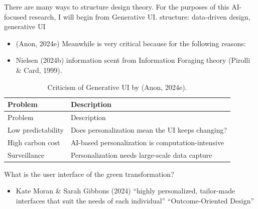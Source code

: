 \documentclass[
  letterpaper,
  DIV=11,
  numbers=noendperiod]{scrartcl}
\providecommand{\tightlist}{%
  \setlength{\itemsep}{0pt}\setlength{\parskip}{0pt}}\usepackage{longtable,booktabs,array}
\begin{document}
There are many ways to structure design theory. For the purposes of this
AI-focused research, I will begin from Generative UI. structure:
data-driven design, generative UI

\begin{itemize}
\item
  (Anon, 2024e) Meanwhile is very critical because for the following
  reasons:
\item
  Nielsen (2024b) information scent from Information Foraging theory
  (Pirolli \& Card, 1999).
\end{itemize}

\begin{longtable}[]{@{}
  >{\raggedright\arraybackslash}p{}
  >{\raggedright\arraybackslash}p{}@{}}
\caption{Criticism of Generative UI by (Anon, 2024e).}\tabularnewline
\toprule\noalign{}
\begin{minipage}[b]{\linewidth}\raggedright
Problem
\end{minipage} & \begin{minipage}[b]{\linewidth}\raggedright
Description
\end{minipage} \\
\midrule\noalign{}
\endfirsthead
\toprule\noalign{}
\begin{minipage}[b]{\linewidth}\raggedright
Problem
\end{minipage} & \begin{minipage}[b]{\linewidth}\raggedright
Description
\end{minipage} \\
\midrule\noalign{}
\endhead
\bottomrule\noalign{}
\endlastfoot
Low predictability & Does personalization mean the UI keeps changing? \\
High carbon cost & AI-based personalization is computation-intensive \\
Surveillance & Personalization needs large-scale data capture \\
\end{longtable}

What is the user interface of the green transformation?

\begin{itemize}
\tightlist
\item
  Kate Moran \& Sarah Gibbons (2024) ``highly personalized, tailor-made
  interfaces that suit the needs of each individual'' ``Outcome-Oriented
  Design''
\end{itemize}
\end{document}
